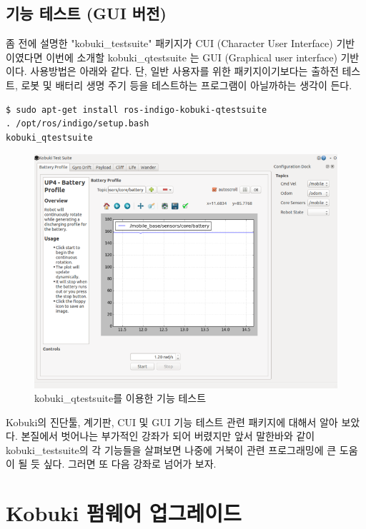 \subsection{기능 테스트 (GUI 버전)}

좀 전에 설명한 "kobuki\_testsuite" 패키지가 CUI (Character User Interface) 기반 이였다면 이번에 소개할 kobuki\_qtestsuite 는 GUI (Graphical user interface) 기반이다. 사용방법은 아래와 같다. 단, 일반 사용자를 위한 패키지이기보다는 출하전 테스트, 로봇 및 배터리 생명 주기 등을 테스트하는 프로그램이 아닐까하는 생각이 든다.

\vspace{\baselineskip}
\begin{lstlisting}[language=ROS]
$ sudo apt-get install ros-indigo-kobuki-qtestsuite
. /opt/ros/indigo/setup.bash
kobuki_qtestsuite
\end{lstlisting}

\begin{figure}[h]
\centering\includegraphics[width=0.9\columnwidth]{pictures/chapter10/kobuki_qtestsuite.png}
\caption{kobuki\_qtestsuite를 이용한 기능 테스트}
\end{figure}

Kobuki의 진단툴, 계기판, CUI 및 GUI 기능 테스트 관련 패키지에 대해서 알아 보았다. 본질에서 벗어나는 부가적인 강좌가 되어 버렸지만 앞서 말한바와 같이 kobuki\_testsuite의 각 기능들을 살펴보면 나중에 거북이 관련 프로그래밍에 큰 도움이 될 듯 싶다. 그러면 또 다음 강좌로 넘어가 보자.

\section{Kobuki 펌웨어 업그레이드}

